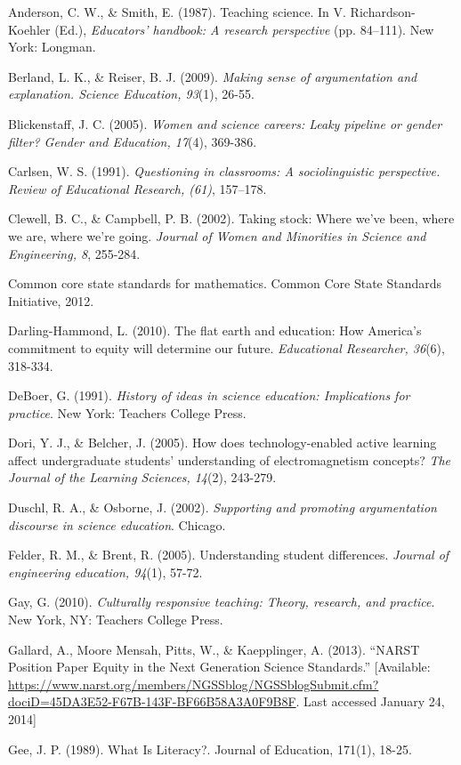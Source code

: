 \documentclass[11.5pt]{sig-alternate} %
\begin{document}
Anderson, C. W., \& Smith, E. (1987). Teaching science. In V. Richardson-Koehler (Ed.), \textit{Educators’ handbook: A research perspective} (pp. 84–111). New York: Longman.

Berland, L. K., \& Reiser, B. J. (2009). \textit{Making sense of argumentation and explanation. Science Education, 93}(1), 26-55. 

Blickenstaff, J. C. (2005). \textit{Women and science careers: Leaky pipeline or gender filter? Gender and Education, 17}(4), 369-386.

Carlsen, W. S. (1991). \textit{Questioning in classrooms: A sociolinguistic perspective. Review of Educational Research, (61)}, 157–178.

Clewell, B. C., \& Campbell, P. B. (2002). Taking stock: Where we’ve been, where we are, where we’re going. \textit{Journal of Women and Minorities in Science and Engineering, 8}, 255-284.

Common core state standards for mathematics. Common Core State Standards Initiative, 2012.

Darling-Hammond, L. (2010). The flat earth and education: How America’s commitment to equity will determine our future. \textit{Educational Researcher, 36}(6), 318-334.

DeBoer, G. (1991). \textit{History of ideas in science education: Implications for practice}. New York: Teachers College Press.

Dori, Y. J., \& Belcher, J. (2005). How does technology-enabled active learning affect undergraduate students' understanding of electromagnetism concepts? \textit{The Journal of the Learning Sciences, 14}(2), 243-279.

Duschl, R. A., \& Osborne, J. (2002). \textit{Supporting and promoting argumentation discourse in science education}. Chicago.

Felder, R. M., \& Brent, R. (2005). Understanding student differences. \textit{Journal of engineering education, 94}(1), 57-72. 

Gay, G. (2010). \textit{Culturally responsive teaching: Theory, research, and practice}. New York, NY: Teachers College Press. 

Gallard, A., Moore Mensah, Pitts, W., \& Kaepplinger, A. (2013). “NARST Position Paper Equity in the Next Generation Science Standards.”  [Available: \url{https://www.narst.org/members/NGSSblog/NGSSblogSubmit.cfm?dociD=45DA3E52-F67B-143F-BF66B58A3A0F9B8F}.  Last accessed January 24, 2014] 

Gee, J. P. (1989). What Is Literacy?. Journal of Education, 171(1), 18-25.
\end{document}
